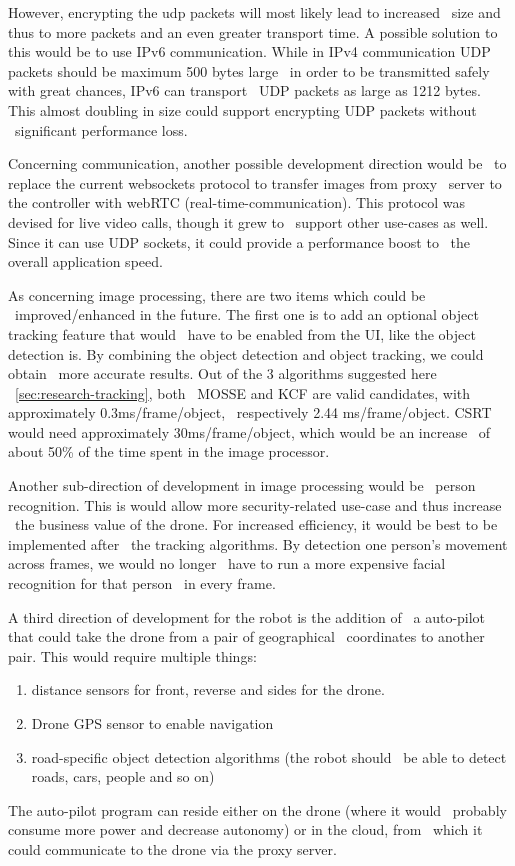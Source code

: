 However, encrypting the udp packets will most likely lead to increased \
size and thus to more packets and an even greater transport time.
A possible solution to this would be to use IPv6 communication.
While in IPv4 communication UDP packets should be maximum 500 bytes large \
in order to be transmitted safely with great chances, IPv6 can transport \
UDP packets as large as 1212 bytes.
This almost doubling in size could support encrypting UDP packets without \
significant performance loss.

Concerning communication, another possible development direction would be \
to replace the current websockets protocol to transfer images from proxy \
server to the controller with webRTC (real-time-communication).
This protocol was devised for live video calls, though it grew to \
support other use-cases as well.
Since it can use UDP sockets, it could provide a performance boost to \
the overall application speed.


As concerning image processing, there are two items which could be \
improved/enhanced in the future.
The first one is to add an optional object tracking feature that would \
have to be enabled from the UI, like the object detection is.
By combining the object detection and object tracking, we could obtain \
more accurate results.
Out of the 3 algorithms suggested here ~\ref{sec:research-tracking}, both \
MOSSE and KCF are valid candidates, with approximately 0.3ms/frame/object, \
respectively 2.44 ms/frame/object.
CSRT would need approximately 30ms/frame/object, which would be an increase \
of about 50\% of the time spent in the image processor.

Another sub-direction of development in image processing would be \
person recognition.
This is would allow more security-related use-case and thus increase \
the business value of the drone.
For increased efficiency, it would be best to be implemented after \
the tracking algorithms.
By detection one person's movement across frames, we would no longer \
have to run a more expensive facial recognition for that person \
in every frame.

A third direction of development for the robot is the addition of \
a auto-pilot that could take the drone from a pair of geographical \
coordinates to another pair.
This would require multiple things:
\begin{enumerate}
    \item distance sensors for front, reverse and sides for the drone.
    \item Drone GPS sensor to enable navigation
    \item road-specific object detection algorithms (the robot should \
            be able to detect roads, cars, people and so on)
\end{enumerate}
The auto-pilot program can reside either on the drone (where it would \
probably consume more power and decrease autonomy) or in the cloud, from \
which it could communicate to the drone via the proxy server.

